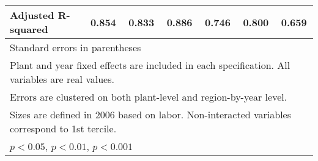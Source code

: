 \begin{table}[htbp]
\begin{tabular}{l*{6}{c}}
Adjusted R-squared&    0.854         &    0.833         &    0.886         &    0.746         &    0.800         &    0.659         \\
\bottomrule
\multicolumn{7}{l}{\footnotesize Standard errors in parentheses}\\
\multicolumn{7}{l}{\footnotesize Plant and year fixed effects are included in each specification. All variables are real values.}\\
\multicolumn{7}{l}{\footnotesize Errors are clustered on both plant-level and region-by-year level.}\\
\multicolumn{7}{l}{\footnotesize Sizes are defined in 2006 based on labor. Non-interacted variables correspond to 1st tercile.}\\
\multicolumn{7}{l}{\footnotesize \sym{*} \(p<0.05\), \sym{**} \(p<0.01\), \sym{***} \(p<0.001\)}\\
\end{tabular}
\end{table}
